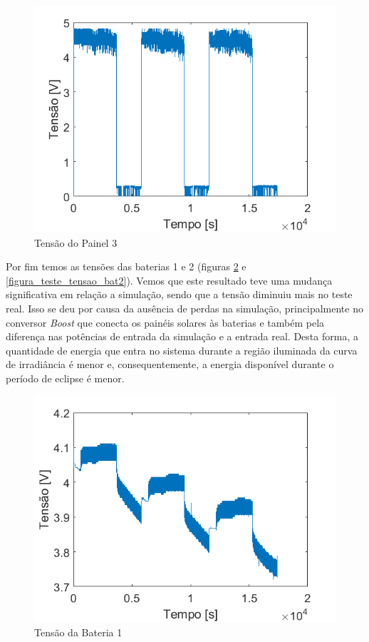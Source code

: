 \begin{figure}[!htpb]
\begin{center}
\includegraphics[scale=0.5]{figures/testPanel3Voltage.png}
\caption{Tensão do Painel 3}
\label{figura_teste_tensao_painel3}
\end{center}
\end{figure}

Por fim temos as tensões das baterias 1 e 2 (figuras \ref{figura_teste_tensao_bat1} e \ref{figura_teste_tensao_bat2}). Vemos que este resultado teve uma mudança significativa em relação a simulação, sendo que a tensão diminuiu mais no teste real. Isso se deu por causa da ausência de perdas na simulação, principalmente no conversor \textit{Boost} que conecta os painéis solares às baterias e também pela diferença nas potências de entrada da simulação e a entrada real. Desta forma, a quantidade de energia que entra no sistema durante a região iluminada da curva de irradiância é menor e, consequentemente, a energia disponível durante o período de eclipse é menor.

\begin{figure}[!htpb]
\begin{center}
\includegraphics[scale=0.5]{figures/testBat1Voltage.png}
\caption{Tensão da Bateria 1}
\label{figura_teste_tensao_bat1}
\end{center}
\end{figure}

